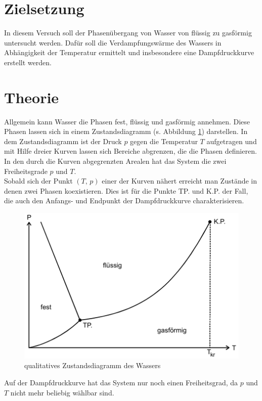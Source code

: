 \section{Zielsetzung}
In diesem Versuch soll der Phasenübergang von Wasser von flüssig zu gasförmig untersucht werden.
Dafür soll die Verdampfungswärme des Wassers in Abhängigkeit der Temperatur ermittelt und insbesondere eine Dampfdruckkurve
erstellt werden.

\section{Theorie}
Allgemein kann Wasser die Phasen fest, flüssig und gasförmig annehmen. Diese Phasen lassen sich in einem Zustandsdiagramm (s. Abbildung \ref{fig:theorie1})
darstellen. In dem Zustandsdiagramm ist der Druck $p$ gegen die Temperatur $T$ aufgetragen und mit Hilfe dreier Kurven lassen sich Bereiche abgrenzen, die 
die Phasen definieren. In den durch die Kurven abgegrenzten Arealen hat das System die zwei Freiheitsgrade $p$ und $T$.\\
Sobald sich der Punkt $(T{,}\,p)$ einer der Kurven nähert erreicht man Zustände in denen zwei Phasen koexistieren. Dies ist für die Punkte TP. und K.P. der Fall, die
auch den Anfangs- und Endpunkt der Dampfdruckkurve charakterisieren.
\label{sec:Theorie}
\begin{figure}
    \centering
    \includegraphics{Theorie1.png}
    \caption{qualitatives Zustandsdiagramm des Wassers \cite{sample}}
    \label{fig:theorie1}
\end{figure}
Auf der Dampfdruckkurve hat das System nur noch einen Freiheitsgrad, da $p$ und $T$ nicht mehr beliebig wählbar sind.

\cite{sample}
